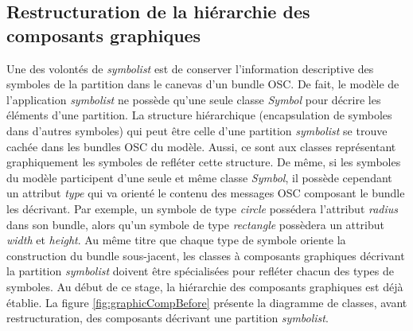 \subsection{Restructuration de la hiérarchie des composants graphiques}
\label{susec:graphicComponentRestruct}
Une des volontés de \textit{symbolist} est de conserver l'information descriptive des symboles de la partition dans le canevas d'un bundle OSC. De fait, le modèle de l'application \textit{symbolist} ne possède qu'une seule classe \textit{Symbol} pour décrire les éléments d'une partition.
La structure hiérarchique (encapsulation de symboles dans d'autres symboles) qui peut être celle d'une partition \textit{symbolist} se trouve cachée dans les bundles OSC du modèle.
Aussi, ce sont aux classes représentant graphiquement les symboles de refléter cette structure.
De même, si les symboles du modèle participent d'une seule et même classe \textit{Symbol}, il possède cependant un attribut \textit{type} qui va orienté le contenu des messages OSC composant le bundle les décrivant.
Par exemple, un symbole de type \textit{circle} possédera l'attribut \textit{radius} dans son bundle, alors qu'un symbole de type \textit{rectangle} possèdera un attribut \textit{width} et \textit{height}.
Au même titre que chaque type de symbole oriente la construction du bundle sous-jacent, les classes à composants graphiques décrivant la partition \textit{symbolist} doivent être spécialisées pour refléter chacun des types de symboles.
Au début de ce stage, la hiérarchie des composants graphiques est déjà établie. La figure \ref{fig:graphicCompBefore} présente la diagramme de classes, avant restructuration, des composants décrivant une partition \textit{symbolist}.

